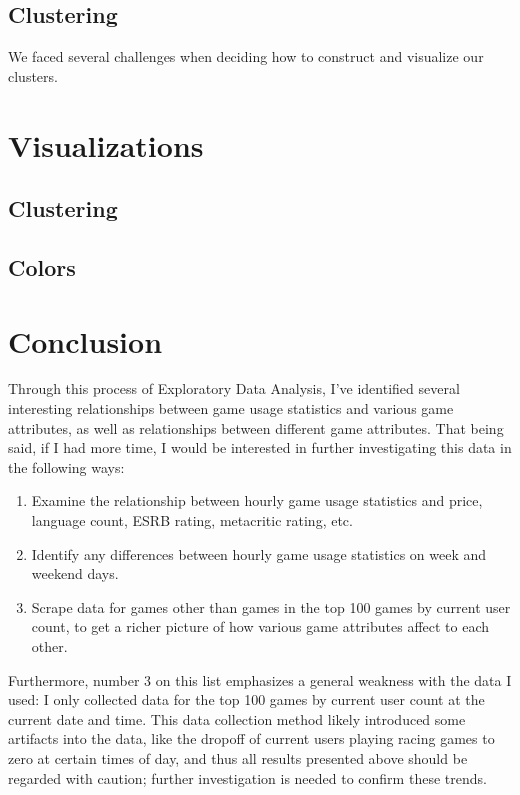 \documentclass[pdftex,12pt,a4paper]{article}
\begin{document}
\subsection{Clustering}
We faced several challenges when deciding how to construct and visualize our clusters.



\section{Visualizations} 


\subsection{Clustering}

\subsection{Colors} 
\section{Conclusion}
Through this process of Exploratory Data Analysis, I've identified several interesting relationships between game usage statistics and various game attributes, as well as relationships between different game attributes. That being said, if I had more time, I would be interested in further investigating this data in the following ways:
\begin{enumerate}
\item Examine the relationship between hourly game usage statistics and price, language count, ESRB rating, metacritic rating, etc.
\item Identify any differences between hourly game usage statistics on week and weekend days.
\item Scrape data for games other than games in the top 100 games by current user count, to get a richer picture of how various game attributes affect to each other.
\end{enumerate}
Furthermore, number 3 on this list emphasizes a general weakness with the data I used: I only collected data for the top 100 games by current user count at the current date and time. This data collection method likely introduced some artifacts into the data, like the dropoff of current users playing racing games to zero at certain times of day, and thus all results presented above should be regarded with caution; further investigation is needed to confirm these trends. 
\end{document}
